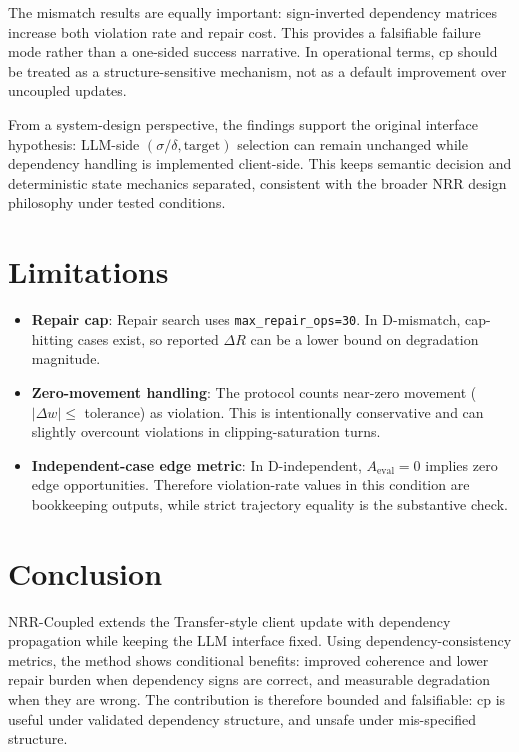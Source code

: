 \documentclass[11pt,a4paper]{article}
\begin{document}
The mismatch results are equally important: sign-inverted dependency matrices increase both violation rate and repair cost. This provides a falsifiable failure mode rather than a one-sided success narrative. In operational terms, cp should be treated as a structure-sensitive mechanism, not as a default improvement over uncoupled updates.

From a system-design perspective, the findings support the original interface hypothesis: LLM-side \((\sigma/\delta,\text{target})\) selection can remain unchanged while dependency handling is implemented client-side. This keeps semantic decision and deterministic state mechanics separated, consistent with the broader NRR design philosophy under tested conditions.

\section{Limitations}
\label{sec:limitations}
\begin{itemize}
  \item \textbf{Repair cap}: Repair search uses \texttt{max\_repair\_ops=30}. In D-mismatch, cap-hitting cases exist, so reported \(\Delta R\) can be a lower bound on degradation magnitude.
  \item \textbf{Zero-movement handling}: The protocol counts near-zero movement (\(|\Delta w|\le\) tolerance) as violation. This is intentionally conservative and can slightly overcount violations in clipping-saturation turns.
  \item \textbf{Independent-case edge metric}: In D-independent, \(A_{\text{eval}}=0\) implies zero edge opportunities. Therefore violation-rate values in this condition are bookkeeping outputs, while strict trajectory equality is the substantive check.
\end{itemize}

\section{Conclusion}
\label{sec:conclusion}
NRR-Coupled extends the Transfer-style client update with dependency propagation while keeping the LLM interface fixed. Using dependency-consistency metrics, the method shows conditional benefits: improved coherence and lower repair burden when dependency signs are correct, and measurable degradation when they are wrong. The contribution is therefore bounded and falsifiable: cp is useful under validated dependency structure, and unsafe under mis-specified structure.
\end{document}

